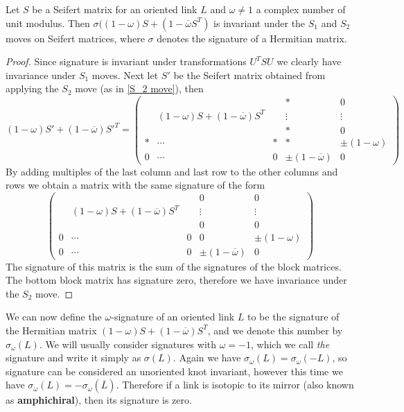 \begin{prop}
Let $S$ be a Seifert matrix for an oriented link $L$ and $\omega \neq 1$ a complex number of unit modulus. Then $\sigma((1-\omega)S+(1-\overline\omega S^T)$ is invariant under the $S_1$ and $S_2$ moves on Seifert matrices, where $\sigma$ denotes the signature of a Hermitian matrix.
\end{prop}
\begin{proof}
Since signature is invariant under transformations $U^T S U$ we clearly have invariance under $S_1$ moves. Next let $S'$ be the Seifert matrix obtained from applying the $S_2$ move (as in \cref{S_2 move}), then
\[ (1-\omega)S' + (1-\overline\omega)S'^T = \begin{pmatrix} & & & * & 0 \\ & (1-\omega)S+(1-\overline\omega)S^T & & \vdots & \vdots \\ & & & * & 0 \\ * & \cdots & * & * & \pm (1-\omega) \\ 0 & \cdots & 0 & \pm (1-\overline\omega) & 0 \end{pmatrix} \]
By adding multiples of the last column and last row to the other columns and rows we obtain a matrix with the same signature of the form
\[ \begin{pmatrix} & & & 0 & 0 \\ & (1-\omega)S+(1-\overline\omega)S^T & & \vdots & \vdots \\ & & & 0 & 0 \\ 0 & \cdots & 0 & 0 & \pm (1-\omega) \\ 0 & \cdots & 0 & \pm (1-\overline\omega) & 0 \end{pmatrix} \]
The signature of this matrix is the sum of the signatures of the block matrices. The bottom block matrix has signature zero, therefore we have invariance under the $S_2$ move.
\end{proof}

We can now define the $\omega$-signature of an oriented link $L$ to be the signature of the Hermitian matrix $(1-\omega)S+(1-\overline\omega)S^T$, and we denote this number by $\sigma_\omega(L)$. We will usually consider signatures with $\omega=-1$, which we call \emph{the} signature and write it simply as $\sigma(L)$. Again we have $\sigma_\omega(L)=\sigma_\omega(-L)$, so signature can be considered an unoriented knot invariant, however this time we have $\sigma_\omega(L) = -\sigma_\omega(\overline L)$. Therefore if a link is isotopic to its mirror (also known as \textbf{amphichiral}), then its signature is zero.

